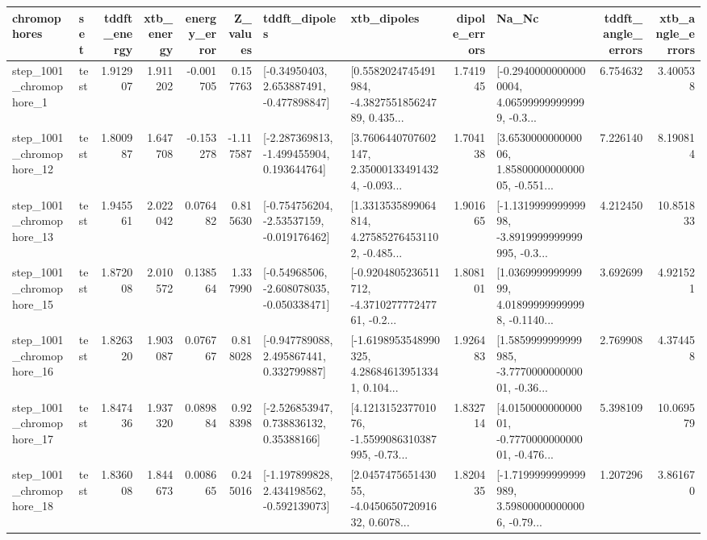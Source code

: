 \begin{tabular}{llrrrrllrlrr}
\toprule
             chromophores &       set &  tddft\_energy &  xtb\_energy &  energy\_error &  Z\_values &                               tddft\_dipoles &                                        xtb\_dipoles &  dipole\_errors &                                              Na\_Nc &  tddft\_angle\_errors &  xtb\_angle\_errors \\
\midrule
  step\_1001\_chromophore\_1 &      test &      1.912907 &    1.911202 &     -0.001705 &  0.157763 &    [-0.34950403, 2.653887491, -0.477898847] &  [0.5582024745491984, -4.382755185624789, 0.435... &       1.741945 &  [-0.29400000000000004, 4.065999999999999, -0.3... &            6.754632 &          3.400538 \\
 step\_1001\_chromophore\_12 &      test &      1.800987 &    1.647708 &     -0.153278 & -1.117587 &   [-2.287369813, -1.499455904, 0.193644764] &  [3.7606440707602147, 2.350001334914324, -0.093... &       1.704138 &  [3.653000000000006, 1.8580000000000005, -0.551... &            7.226140 &          8.190814 \\
 step\_1001\_chromophore\_13 &      test &      1.945561 &    2.022042 &      0.076482 &  0.815630 &   [-0.754756204, -2.53537159, -0.019176462] &  [1.3313535899064814, 4.275852764531102, -0.485... &       1.901665 &  [-1.131999999999998, -3.8919999999999995, -0.3... &            4.212450 &         10.851833 \\
 step\_1001\_chromophore\_15 &      test &      1.872008 &    2.010572 &      0.138564 &  1.337990 &   [-0.54968506, -2.608078035, -0.050338471] &  [-0.9204805236511712, -4.371027777247761, -0.2... &       1.808101 &  [1.036999999999999, 4.018999999999998, -0.1140... &            3.692699 &          4.921521 \\
 step\_1001\_chromophore\_16 &      test &      1.826320 &    1.903087 &      0.076767 &  0.818028 &    [-0.947789088, 2.495867441, 0.332799887] &  [-1.6198953548990325, 4.286846139513341, 0.104... &       1.926483 &  [1.5859999999999985, -3.777000000000001, -0.36... &            2.769908 &          4.374458 \\
 step\_1001\_chromophore\_17 &      test &      1.847436 &    1.937320 &      0.089884 &  0.928398 &     [-2.526853947, 0.738836132, 0.35388166] &  [4.121315237701076, -1.5599086310387995, -0.73... &       1.832714 &  [4.015000000000001, -0.777000000000001, -0.476... &            5.398109 &         10.069579 \\
 step\_1001\_chromophore\_18 &      test &      1.836008 &    1.844673 &      0.008665 &  0.245016 &   [-1.197899828, 2.434198562, -0.592139073] &  [2.045747565143055, -4.045065072091632, 0.6078... &       1.820435 &  [-1.7199999999999989, 3.598000000000006, -0.79... &            1.207296 &          3.861670 \\

\end{tabular}
